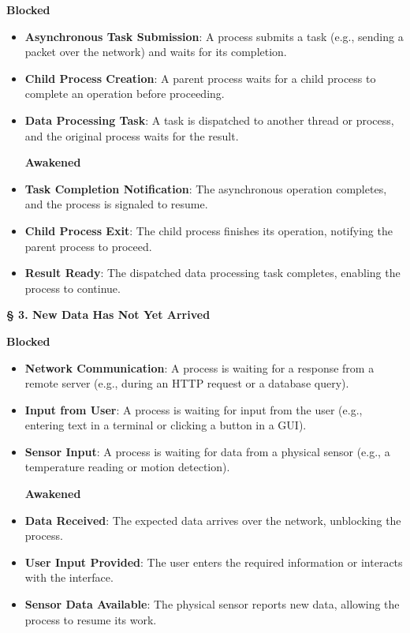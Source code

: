 \documentclass[a4paper]{book}
\newcommand{\sfbf}[1]{{\normalsize\textsf{\textbf{§ #1}}}}
\begin{document}
\textbf{Blocked}
\begin{itemize}
\item 
\textbf{Asynchronous Task Submission}: A process submits a task (e.g., sending a packet over the network) and waits for its completion.

\item 
\textbf{Child Process Creation}: A parent process waits for a child process to complete an operation before proceeding.

\item 
\textbf{Data Processing Task}: A task is dispatched to another thread or process, and the original process waits for the result.

\textbf{Awakened}

\item 
\textbf{Task Completion Notification}: The asynchronous operation completes, and the process is signaled to resume.

\item 
\textbf{Child Process Exit}: The child process finishes its operation, notifying the parent process to proceed.

\item 
\textbf{Result Ready}: The dispatched data processing task completes, enabling the process to continue.

\end{itemize}

\hrulefill

\sfbf{3. New Data Has Not Yet Arrived}

\textbf{Blocked}
\begin{itemize}
\item 
\textbf{Network Communication}: A process is waiting for a response from a remote server (e.g., during an HTTP request or a database query).

\item 
\textbf{Input from User}: A process is waiting for input from the user (e.g., entering text in a terminal or clicking a button in a GUI).

\item 
\textbf{Sensor Input}: A process is waiting for data from a physical sensor (e.g., a temperature reading or motion detection).

\textbf{Awakened}

\item 
\textbf{Data Received}: The expected data arrives over the network, unblocking the process.

\item 
\textbf{User Input Provided}: The user enters the required information or interacts with the interface.

\item 
\textbf{Sensor Data Available}: The physical sensor reports new data, allowing the process to resume its work.

\end{itemize}
\end{document}
